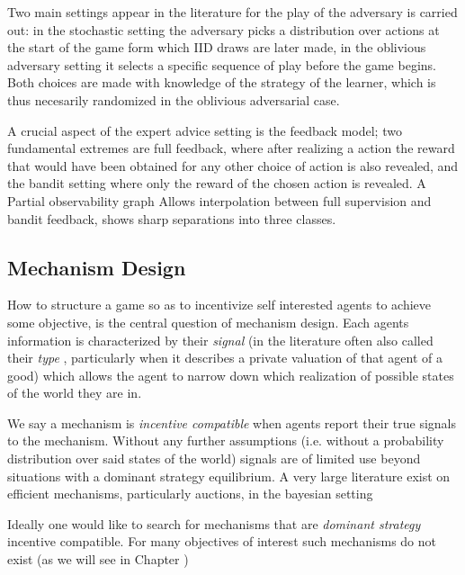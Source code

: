 Two main settings appear in the literature for the play of the adversary is carried out: in the stochastic setting the adversary picks a distribution over actions at the start of the game form which IID draws are later made, in the oblivious adversary setting it selects a specific sequence of play before the game begins. Both choices are made with knowledge of the strategy of the learner, which is thus necesarily randomized in the oblivious adversarial case.

A crucial aspect of the expert advice setting is the feedback model; two fundamental extremes are full feedback, where after realizing a action the reward that would have been obtained for any other choice of action is also revealed, and the bandit setting where only the reward of the chosen action is revealed. 
A Partial observability graph Allows interpolation between full supervision and bandit feedback, shows sharp separations into three classes. 


\subsection{Mechanism Design}

How to structure a game so as to incentivize self interested agents to achieve some objective, is the central question of mechanism design.
Each agents information is characterized by their \emph{signal} (in the literature often also called their \emph{type} , particularly when it describes a private valuation of that agent of a good) which allows the agent to narrow down which realization of possible states of the world they are in. 

We say a mechanism is \emph{incentive compatible} when agents report their true signals to the mechanism. 
Without any further assumptions (i.e. without a probability distribution over said states of the world) signals are of limited use beyond situations with a dominant strategy equilibrium.
A very large literature exist on efficient mechanisms, particularly auctions, in the bayesian setting

Ideally one would like to search for mechanisms that are  \emph{dominant strategy} incentive compatible.
For many objectives of interest such mechanisms do not exist (as we will see in Chapter )



